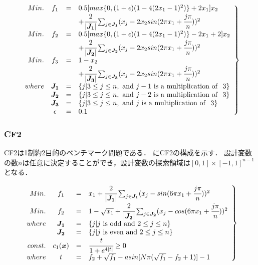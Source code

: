 \documentclass[../main/main]{subfiles}
\begin{document}
\begin{eqnarray} 
\left.
\begin{array}{rccl}
Min. & f_1 &=& 0.5[max\{0, (1 + \epsilon)(1 - 4(2x_1 - 1)^2)\} + 2x_1]x_2 \\
                     &&&                             + \cfrac{2}{|\bm{J_1}|} \sum_{j \in \bm{J_1}}(x_j - 2x_2 sin(2 \pi x_1 + \cfrac{j \pi}{n} ))^2\\
Min. & f_2 &=& 0.5[max\{0, (1 + \epsilon)(1 - 4(2x_1 - 1)^2)\} - 2x_1 + 2]x_2 \\
                      &&&                             + \cfrac{2}{|\bm{J_2}|} \sum_{j \in \bm{J_2}}(x_j - 2x_2 sin(2 \pi x_1 + \cfrac{j \pi}{n} ))^2\\
Min. & f_3 &=& 1-x_2 \\
                                            &&&+ \cfrac{2}{|\bm{J_3}|} \sum_{j \in \bm{J_3}}(x_j - 2x_2 sin(2 \pi x_1 + \cfrac{j \pi}{n} ))^2\\

where &  \bm{J_1} &=& \{j|3 \leq j \leq n, {\rm \ and \ } j - 1 {\rm \ is \ a \ multiplication \ of \ \ } 3\}\\
& \bm{J_2} &=& \{j|3 \leq j \leq n, {\rm \ and \ } j - 2 {\rm \ is \ a \ multiplication \ of \ \ } 3\}\\
& \bm{J_3} &=& \{j|3 \leq j \leq n, {\rm \ and \ } j {\rm \ is \ a \ multiplication \ of \ \ } 3\}\\
&  \epsilon &=& 0.1

   \label{uf9_eq} 
\end{array}
\right\}
\end{eqnarray}

\subsubsection{CF2}
CF2は1制約2目的のベンチマーク問題である．
にCF2の構成を示す．
設計変数の数$n$は任意に決定することができ，設計変数の探索領域は$[0,1] \times [-1,1]^{n-1}$となる．

\begin{eqnarray} 
\left.
\begin{array}{rccl}
Min. & f_1 &=& x_1 + \cfrac{2}{|\bm{J_1}|} \sum_{j \in \bm{J_1}}(x_j - sin(6\pi x_1 + \cfrac{j\pi}{n}))^2\\
Min. &f_2 &=& 1 - \sqrt{x_1} + \cfrac{2}{|\bm{J_2}|} \sum_{j \in \bm{J_2}} (x_j - cos(6\pi x_1 + \cfrac{j\pi}{n}))^2\\

where &  \bm{J_1} &=& \{j|j {\rm \ is \ odd \ and \ } 2 \leq j \leq n\}\\
& \bm{J_2} &=& \{j|j {\rm \ is \ even \ and \ } 2 \leq j \leq n\}\\
const. & c_1(\bm x) & = &\cfrac{t}{1 + e^{4|t|}} \geq 0\\
where & t &=& f_2 + \sqrt{f_1} - a sin[N\pi (\sqrt{f_1} - f_2 + 1)] - 1\\
   \label{cf2_eq} 
\end{array}
\right\}
\end{eqnarray}
\end{document}
